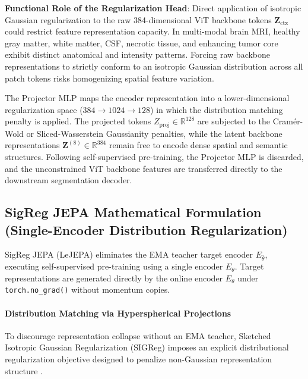 \documentclass{article}
\begin{document}
\textbf{Functional Role of the Regularization Head}: Direct application of isotropic Gaussian regularization to the raw 384-dimensional ViT backbone tokens $\mathbf{Z}_{\text{ctx}}$ could restrict feature representation capacity. In multi-modal brain MRI, healthy gray matter, white matter, CSF, necrotic tissue, and enhancing tumor core exhibit distinct anatomical and intensity patterns. Forcing raw backbone representations to strictly conform to an isotropic Gaussian distribution across all patch tokens risks homogenizing spatial feature variation.

The Projector MLP maps the encoder representation into a lower-dimensional regularization space ($384 \to 1024 \to 128$) in which the distribution matching penalty is applied. The projected tokens $Z_{\text{proj}} \in \mathbb{R}^{128}$ are subjected to the Cram\'er-Wold or Sliced-Wasserstein Gaussianity penalties, while the latent backbone representations $\mathbf{Z}^{(8)} \in \mathbb{R}^{384}$ remain free to encode dense spatial and semantic structures. Following self-supervised pre-training, the Projector MLP is discarded, and the unconstrained ViT backbone features are transferred directly to the downstream segmentation decoder.

\subsection{SigReg JEPA Mathematical Formulation (Single-Encoder Distribution Regularization)}

SigReg JEPA (LeJEPA) \citep{balestriero2025lejepa} eliminates the EMA teacher target encoder $E_{\bar{\theta}}$, executing self-supervised pre-training using a single encoder $E_\theta$. Target representations are generated directly by the online encoder $E_\theta$ under \texttt{torch.no\_grad()} without momentum copies.

\paragraph{Distribution Matching via Hyperspherical Projections}
To discourage representation collapse without an EMA teacher, Sketched Isotropic Gaussian Regularization (SIGReg) imposes an explicit distributional regularization objective designed to penalize non-Gaussian representation structure \citep{balestriero2025lejepa}.
\end{document}
